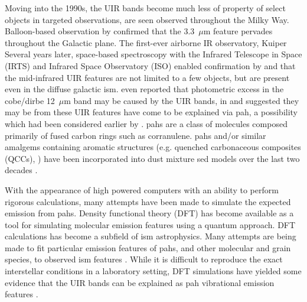      Moving into the 1990s, the UIR bands become much less of property of select objects in targeted observations, are seen observed throughout the Milky Way. Balloon-based observation by \cite{giard94} confirmed that the 3.3~$\mu$m feature pervades throughout the Galactic plane. The first-ever airborne IR observatory, Kuiper Several years later, space-based spectroscopy with the Infrared Telescope in Space (IRTS)\citep{murakami96} and Infrared Space Observatory (ISO)\citep{kessler96} enabled confirmation by \cite{onaka96} and \cite{mattila96} that the mid-infrared UIR features are not limited to a few objects, but are present even in the diffuse galactic \acrshort{ism}. \cite{dwek97} even reported that photometric excess in the \acrshort{cobe}/\acrshort{dirbe} 12~$\mu$m band may be caused by the UIR bands, in and suggested they may be from these UIR features have come to be explained via \acrshort{pah}, a possibility which had been considered earlier by \cite{allamandola85,puget85}. \acrshort{pah}s are a class of molecules composed primarily of fused carbon rings such as corranulene. \acrshort{pah}s and/or similar amalgems containing aromatic structures (e.g. quenched carbonaceous composites (QCCs), \cite{sakata84}) have been incorporated into dust mixture \acrshort{sed} models over the last two decades \citep{drli01, drli07, hony01, dustem11, galliano11, jones13, jones17}.

     With the appearance of high powered computers with an ability to perform rigorous calculations, many attempts have been made to simulate the expected emission from \acrshort{pah}s. Density functional theory (DFT) \citep{honenberg64} has become available as a tool for simulating molecular emission features using a quantum approach. DFT calculations has become a subfield of \acrshort{ism} astrophysics. Many attempts are being made to fit particular emission features of \acrshort{pah}s, and other molecular and grain species, to observed \acrshort{ism} features \citep{hammonds09,hirata99}.
     While it is difficult to reproduce the exact interstellar conditions in a laboratory setting, DFT simulations have yielded some evidence that the UIR bands can be explained as \acrshort{pah} vibrational emission features \citep{pathak12,ricca11,yu12}.

